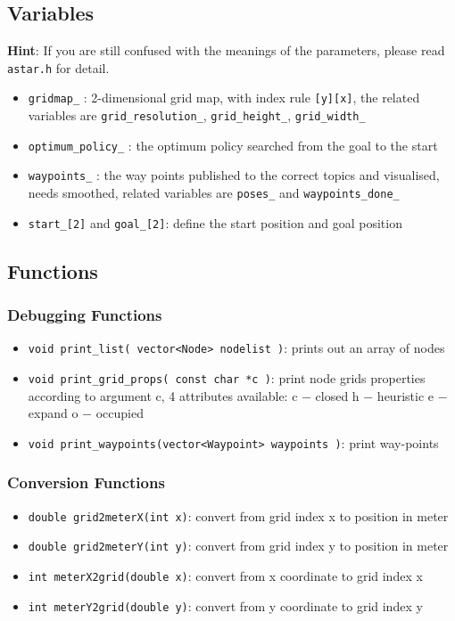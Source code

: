\documentclass[twoside,11pt]{article}
\begin{document}
\subsection*{Variables}
\textbf{Hint}: If you are still confused with the meanings of the parameters, please read \texttt{astar.h} for detail.
\begin{itemize}
	\item \texttt{gridmap\_} : 2-dimensional grid map, with index rule \texttt{[y][x]}, the related variables are \texttt{grid\_resolution\_},
	\texttt{grid\_height\_}, \texttt{grid\_width\_}
	\item \texttt{optimum\_policy\_} : the optimum policy searched from the goal to the start
	\item \texttt{waypoints\_} : the way points published to the correct topics and visualised, needs smoothed,
	related variables are \texttt{poses\_} and \texttt{waypoints\_done\_}
	\item \texttt{start\_[2]} and \texttt{goal\_[2]}: define the start position and goal position
\end{itemize}

\subsection*{Functions}

\subsubsection*{Debugging Functions}
\begin{itemize}
	\item \texttt{void print\_list( vector<Node> nodelist )}: prints out an array of nodes
	\item \texttt{void print\_grid\_props( const char *c )}: print node grids properties according to argument c, 4 attributes available:
	c − closed
	h − heuristic
	e − expand
	o − occupied
	\item \texttt{void print\_waypoints(vector<Waypoint> waypoints )}: print way-points
\end{itemize}

\subsubsection*{Conversion Functions}
\begin{itemize}
	\item \texttt{double grid2meterX(int x)}: convert from grid index x to position in meter
	\item \texttt{double grid2meterY(int y)}: convert from grid index y to position in meter
	\item \texttt{int meterX2grid(double x)}: convert from x coordinate to grid index x
	\item \texttt{int meterY2grid(double y)}: convert from y coordinate to grid index y	 
\end{itemize}
\end{document}
